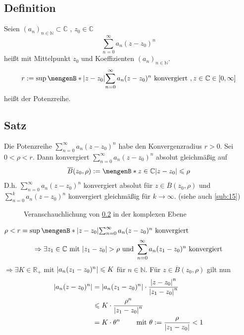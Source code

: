 \subsection[Definition Potenzreihe und Konvergenzradius]{Definition} %
\label{sub:19}
Seien $(a_n)_{n \in \mathds{N} } \subset \mathds{C}$ , $z_0 \in \mathds{C}$
\[
	\sum_{n=0}^{\infty} a_n (z-z_0)^n 
\]
heißt  mit Mittelpunkt $z_0$ und Koeffizienten $(a_n)_{n \in \mathds{N}}$.
\[
	r := \sup \set[\abs*{z -z_0} ]{ \sum_{n=0}^{\infty} a_n (z-z_0)^n \text{ konvergiert } , z \in \mathds{C} } \in [0, \infty]
\]
heißt  der Potenzreihe.

\subsection[Satz über absolute gleichmäßige Konvergenz innerhalb des Konvergenzradius]{Satz} %
\label{sub:110}
Die Potenzreihe $\sum_{n=0}^{\infty} a_n (z-z_0)^n$ habe den Konvergenzradius $r>0$. Sei $0 < \rho < r$. Dann konvergiert $\sum_{n=0}^{\infty} a_n (z -z_0)^n$ absolut
gleichmäßig auf 
\[
	\overline{B}(z_0, \rho) := \set[z \in \mathds{C}]{\abs*{z-z_0} \le \rho }  
\]
D.h. $\sum_{n=0}^{\infty} a_n (z-z_0)^n $ konvergiert absolut für $z \in \overline{B}(z_0, \rho) $ und $\sum_{n=0}^{k} a_n (z-z_0 )^n$ konvergiert gleichmäßig für
$k \to \infty$. {\footnotesize (siehe auch \ref{sub:15})}
\begin{figure}[ht]
	\caption{Veranschauchlichung von \ref{sub:110} in der komplexen Ebene}
\end{figure}
$\rho < r = \sup \set[\abs*{z -z_0} ]{ \sum_{n=0}^{\infty} a_n (z-z_0)^n \text{ konvergiert}}$ 
\[
	\Rightarrow \exists z_1 \in \mathds{C} \text{ mit } \abs*{z_1 -z_0} > \rho \text{ und } \sum_{n=0}^{\infty} a_n (z_1 -z_0)^n \text{ konvergiert} 
\]
$\Rightarrow \exists K \in \mathds{R}_+$ mit $\abs*{a_n (z_1 -z _0)^n}\le  K$ für $n \in \mathds{N} $. Für $z \in \overline{B}(z_0, \rho) $ gilt nun 
\begin{align*}
	\abs*{a_n (z-z_0)^n} &= \abs*{a_n (z_1 -z_0)^n} \cdot \frac{\abs*{z-z_0}^n }{\abs*{z_1-z_0}^n }  \\
	&\le K \cdot \frac{\rho^n}{\abs*{z_1- z_0}^n } \\
	&= K \cdot \theta^n \qquad \text{ mit } \theta := \frac{\rho}{\abs*{z_1 -z_0} } < 1 
\end{align*}
